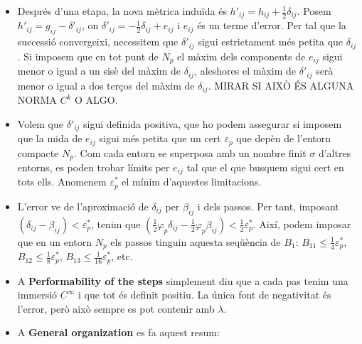 {\begin{itemize}
    \begin{itemize}
        \item[$\bullet$] $B_1$ és el màxim error que volem en l'aproximació del canvi mètric, \\$a_\nu\left(\frac{\partial\psi^\nu}{\partial x^i}\right)\left(\frac{\partial\psi^\nu}{\partial x^j}\right)$.
        \item[$\bullet$] $B_2$ és el màxim error $O(1/\lambda)$ que volem en el canvi de les primeres derivades.
        \item[$\bullet$] $B_3$ és la cota de $\overline{z}^\alpha - z^\alpha$.
    \end{itemize}
    \item Després d'una etapa, la nova mètrica induïda és $h'_{ij} = h_{ij} + \frac12\delta_{ij}$. Posem $h'_{ij} = g_{ij} - \delta'_{ij}$, on $\delta'_{ij} =-\frac12\delta_{ij} +e_{ij}$ i $e_{ij}$ és un terme d'error. Per tal que la successió convergeixi, necessitem que $\delta'_{ij}$ sigui estrictament més petita que $\delta_{ij}$. Si imposem que en tot punt de $N_p$ el màxim dels components de $e_{ij}$ sigui menor o igual a un sisè del màxim de $\delta_{ij}$, aleshores el màxim de $\delta'_{ij}$ serà menor o igual a dos terços del màxim de $\delta_{ij}$. MIRAR SI AIXÒ ÉS ALGUNA NORMA $C^k$ O ALGO.
    \item Volem que $\delta'_{ij}$ sigui definida positiva, que ho podem assegurar si imposem que la mida de $e_{ij}$ sigui més petita que un cert $\varepsilon_p$ que depèn de l'entorn compacte $N_p$. Com cada entorn se superposa amb un nombre finit $\sigma$ d'altres entorns, es poden trobar límits per $e_{ij}$ tal que el que busquem sigui cert en tots ells. Anomenem $\varepsilon_p^*$ el mínim d'aquestes limitacions.  
    \item L'error ve de l'aproximació de $\delta_{ij}$ per $\beta_{ij}$ i dels passos. Per tant, imposant $(\delta_{ij}- \beta_{ij}) < \varepsilon_p^*$, tenim que $(\frac12\varphi_p\delta_{ij}- \frac12\varphi_p\beta_{ij}) < \frac12\varepsilon_p^*$. Així, podem imposar que en un entorn $N_p$ els passos tinguin aquesta seqüència de $B_{1}$: $B_{11}\le\frac14\varepsilon_p^*$, $B_{12}\le\frac18\varepsilon_p^*$, $B_{13}\le\frac1{16}\varepsilon_p^*$, etc.
    \item A \textbf{Performability of the steps} simplement diu que a cada pas tenim una immersió $C^\infty$ i que tot és definit positiu. La única font de negativitat és l'error, però això sempre es pot contenir amb $\lambda$.
    \item A \textbf{General organization} es fa aquest resum:

\end{itemize}}
